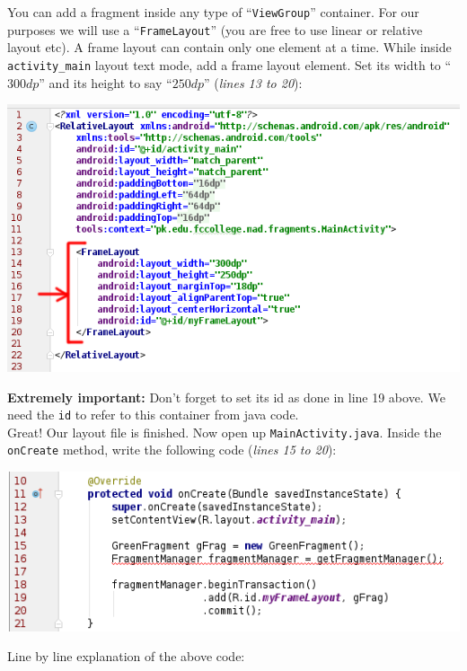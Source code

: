 You can add a fragment inside any type of ``\texttt{ViewGroup}'' container. For our purposes we will use a ``\texttt{FrameLayout}'' (you are free to use linear or relative layout etc). A frame layout can contain only one element at a time. While inside \texttt{activity\_main} layout text mode, add a frame layout element. Set its
width to ``$300dp$'' and its height to say ``$250dp$'' (\textit{lines 13 to 20}):

\begin{center}
	\includegraphics[scale=\SourceCodeScale]{chapters/ch11/images/15}
\end{center}

\textbf{Extremely important:} Don't forget to set its id as done in line 19 above. We need the \texttt{id} to refer to this container from java code. \\

Great! Our layout file is finished. Now open up \texttt{MainActivity.java}. Inside the \texttt{onCreate} method, write the following code (\textit{lines 15 to 20}):

\begin{center}
	\includegraphics[scale=\SourceCodeScale]{chapters/ch11/images/16}
\end{center}

Line by line explanation of the above code:

